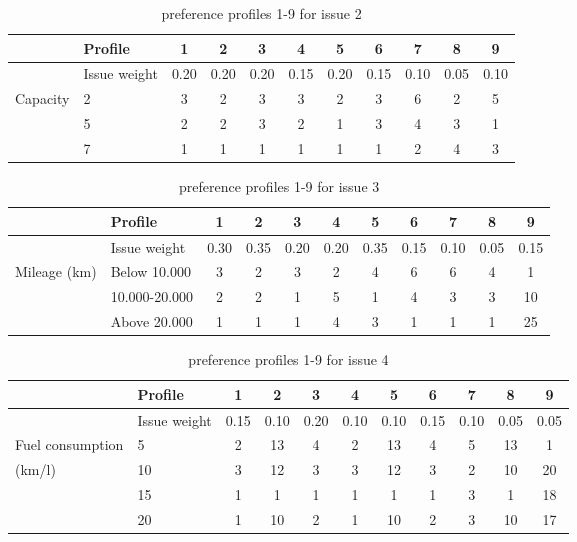 \documentclass[11pt,a4paper]{report}
\begin{document}
\begin{table}[H]
\centering
\caption{preference profiles 1-9 for issue 2}
\label{tab:issue2}
\begin{tabular}{|p{3cm}|p{3cm}||c|c|c||c|c|c||c|c|c|}
\hline
&Profile & 1 & 2 & 3 & 4 & 5 & 6 & 7 & 8 & 9 \\
\hline
&Issue weight& 0.20 & 0.20 & 0.20 & 0.15 & 0.20 & 0.15 & 0.10 & 0.05 & 0.10 \\
\hline
\hline
Capacity & 2 & 3 & 2 &3 &3 &2 &3 &6 &2 &5 \\
&5           & 2 & 2 &3 &2 &1 &3 &4 &3 &1 \\
&7           & 1 & 1 &1 &1 &1 &1 &2 &4 &3 \\
\hline
\end{tabular}
\end{table}



\begin{table}[H]
\centering
\caption{preference profiles 1-9 for issue 3}
\label{tab:issue3}
\begin{tabular}{|p{3cm}|p{3cm}||c|c|c||c|c|c||c|c|c|}
\hline
&Profile & 1 & 2 & 3 & 4 & 5 & 6 & 7 & 8 & 9 \\
\hline
&Issue weight& 0.30 & 0.35 & 0.20 & 0.20 & 0.35 & 0.15 & 0.10 & 0.05 & 0.15 \\
\hline
\hline
Mileage (km)
&Below 10.000    & 3 & 2 &3 &2 &4 &6 &6 &4 &1 \\
&10.000-20.000   & 2 & 2 &1 &5 &1 &4 &3 &3 &10 \\
&Above 20.000    & 1 & 1 &1 &4 &3 &1 &1 &1 &25 \\
\hline
\end{tabular}
\end{table}



\begin{table}[H]
\centering
\caption{preference profiles 1-9 for issue 4}
\label{tab:issue4}
\begin{tabular}{|p{3cm}|p{3cm}||c|c|c||c|c|c||c|c|c|}
\hline
&Profile & 1 & 2 & 3 & 4 & 5 & 6 & 7 & 8 & 9 \\
\hline
&Issue weight& 0.15 & 0.10 & 0.20 & 0.10 & 0.10 & 0.15 & 0.10 & 0.05 & 0.05 \\
\hline
\hline
Fuel consumption &5   & 2 & 13 &4 &2 &13 &4 &5 &13 &1  \\
(km/l)           &10  & 3 & 12 &3 &3 &12 &3 &2 &10 &20 \\
                 &15  & 1 & 1  &1 &1 &1  &1 &3 &1  &18 \\
                 &20  & 1 & 10 &2 &1 &10 &2 &3 &10 &17 \\
\hline
\end{tabular}
\end{table}
\end{document}
